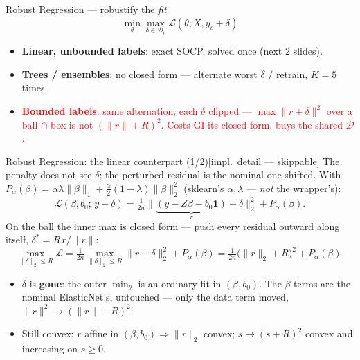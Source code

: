 \documentclass{beamer}
\newcommand{\implnote}{\hfill{\normalfont\scriptsize\color{gray}[impl.\ detail --- skippable]}}
\newcommand{\mc}[1]{\textcolor{red}{#1}}
\begin{document}
\begin{frame}{Robust Regression --- robustify the \emph{fit}}
  \[
    \min_\theta \max_{\delta\in\mathcal D_c} \mathcal L(\theta; X, y_c+\delta)
  \]
  \begin{itemize}
    \item \textbf{Linear, unbounded labels}: exact SOCP, solved once (next 2 slides).
    \item \textbf{Trees / ensembles}: no closed form --- alternate worst $\delta$ /
      retrain, $K=5$ times.
    \item \mc{\textbf{Bounded labels}: same alternation, each $\delta$ clipped ---
      $\max\lVert r+\delta\rVert^2$ over a ball $\cap$ box is not
      $(\lVert r\rVert+R)^2$. Costs GI its closed form, buys the shared
      $\mathcal D$.}
  \end{itemize}
\end{frame}

\begin{frame}{Robust Regression: the linear counterpart (1/2)\implnote}
  \small
  The penalty does not see $\delta$; the perturbed residual is the nominal one shifted.
  With $P_\alpha(\beta)=\alpha\lambda\lVert\beta\rVert_1+\tfrac{\alpha}{2}(1-\lambda)\lVert\beta\rVert_2^2$
  (sklearn's $\alpha,\lambda$ --- \emph{not} the wrapper's):
  \[
    \mathcal L(\beta,b_0;\,y+\delta)
      = \tfrac{1}{2n}\big\lVert \underbrace{(y-Z\beta-b_0\mathbf 1)}_{r}+\delta\big\rVert_2^2
        + P_\alpha(\beta).
  \]
  On the ball the inner max is closed form --- push every residual outward along
  itself, $\delta^\ast = R\,r/\lVert r\rVert$:
  \[
    \max_{\lVert\delta\rVert_2\le R}\mathcal L
      = \tfrac{1}{2n}\max_{\lVert\delta\rVert_2\le R}\lVert r+\delta\rVert_2^2 + P_\alpha(\beta)
      = \tfrac{1}{2n}\big(\lVert r\rVert_2+R\big)^2 + P_\alpha(\beta).
  \]
  \begin{itemize}
    \item $\delta$ is \textbf{gone}: the outer $\min_\theta$ is an ordinary fit in
      $(\beta,b_0)$. The $\beta$ terms are the nominal ElasticNet's, untouched ---
      only the data term moved, $\lVert r\rVert^2\to(\lVert r\rVert+R)^2$.
    \item Still convex: $r$ affine in $(\beta,b_0)\Rightarrow\lVert r\rVert_2$ convex;
      $s\mapsto(s+R)^2$ convex and increasing on $s\ge0$.
  \end{itemize}
\end{frame}
\end{document}
